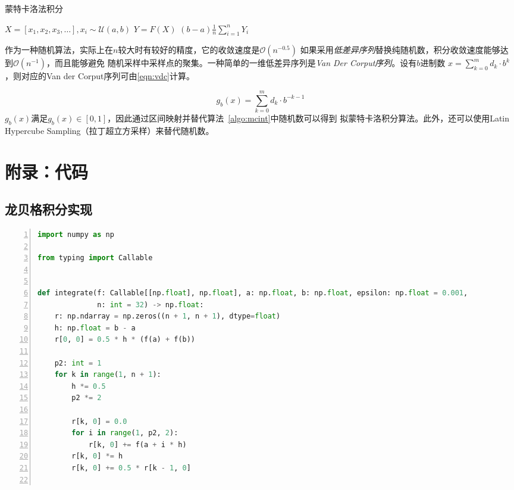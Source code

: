 \documentclass[a4paper,twoside]{article}
\begin{document}
\begin{spacing}{1.2}
\begin{algorithm}
	\caption{蒙特卡洛法积分}
	\label{algo:mcint}
	\begin{algorithmic}[1]
		
		\State $X=[x_1,x_2,x_3,\ldots], x_i \sim\mathcal{U}(a,b)$
		\State $Y=F(X)$
		\State \Return $(b-a)\frac{1}{n}\sum_{i=1}^nY_i$
		\EndProcedure
	\end{algorithmic}
\end{algorithm}	

作为一种随机算法，实际上在$n$较大时有较好的精度，它的收敛速度是$\mathcal{O}(n^{-0.5})$
如果采用\emph{低差异序列}替换纯随机数，积分收敛速度能够达到$\mathcal{O}(n^{-1})$，而且能够避免
随机采样中采样点的聚集。一种简单的一维低差异序列是\emph{Van Der Corput序列}。设有$b$进制数
$x=\sum_{k=0}^md_k\cdot b^k$，则对应的Van der Corput序列可由\eqref{eqn:vdc}计算。

\begin{equation}
	\label{eqn:vdc}
	g_b(x)=\sum_{k=0}^{m}d_k\cdot b^{-k-1}
\end{equation}
$g_b(x)$满足$g_b(x)\in [0,1]$，因此通过区间映射并替代算法~\ref{algo:mcint}中随机数可以得到
拟蒙特卡洛积分算法。此外，还可以使用Latin Hypercube Sampling（拉丁超立方采样）来替代随机数。

\clearpage

\section{附录：代码}
\label{sec:app_code}

\subsection{龙贝格积分实现}
\begin{lstlisting}[language=Python,numbers=left,style=PythonStyle,label={code:romberg},caption=龙贝格积分实现]
import numpy as np

from typing import Callable


def integrate(f: Callable[[np.float], np.float], a: np.float, b: np.float, epsilon: np.float = 0.001,
              n: int = 32) -> np.float:
    r: np.ndarray = np.zeros((n + 1, n + 1), dtype=float)
    h: np.float = b - a
    r[0, 0] = 0.5 * h * (f(a) + f(b))

    p2: int = 1
    for k in range(1, n + 1):
        h *= 0.5
        p2 *= 2

        r[k, 0] = 0.0
        for i in range(1, p2, 2):
            r[k, 0] += f(a + i * h)
        r[k, 0] *= h
        r[k, 0] += 0.5 * r[k - 1, 0]


\end{lstlisting}
\end{spacing}
\end{document}
